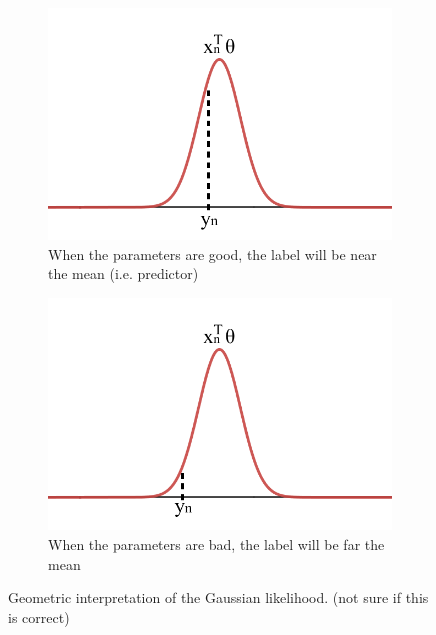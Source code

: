 \begin{description}
        \begin{figure}[ht]
            \begin{subfigure}{.45\textwidth}
                \centering
                \includegraphics[width=.75\linewidth]{img/gaussian_mle_good.png}
                \caption{When the parameters are good, the label will be near the mean (i.e. predictor)}
            \end{subfigure}
            \hspace*{1em}
            \begin{subfigure}{.45\textwidth}
                \centering
                \includegraphics[width=.75\linewidth]{img/gaussian_mle_bad.png}
                \caption{When the parameters are bad, the label will be far the mean}
            \end{subfigure}

            \caption{Geometric interpretation of the Gaussian likelihood. (not sure if this is correct)}
        \end{figure}
\end{description}


